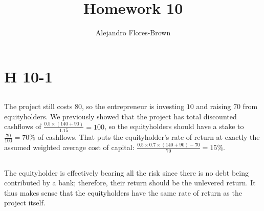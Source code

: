 \documentclass[12pt, letterpaper, parskip = full]{article}
\title{Homework 10}
\author{Alejandro Flores-Brown}
\begin{document}
	\maketitle

    \section{H 10-1}

    \subsection{}

    The project still costs \(80\), so the entrepreneur is investing \(10\) and raising \(70\) from equityholders. We previously showed that the project has total discounted cashflows of \( \frac{0.5 \times (140 + 90)}{1.15} = 100  \), so the equityholders should have a stake to \( \frac{70}{100} = 70\% \) of cashflows. That puts the equityholder's rate of return at exactly the assumed weighted average cost of capital: \(\frac{0.5 \times 0.7 \times (140 + 90) - 70}{70} = 15\%\). 

    



    \subsection{}

    The equityholder is effectively bearing all the risk since there is no debt being contributed by a bank; therefore, their return should be the unlevered return. It thus makes sense that the equityholders have the same rate of return as the project itself.
\end{document}
